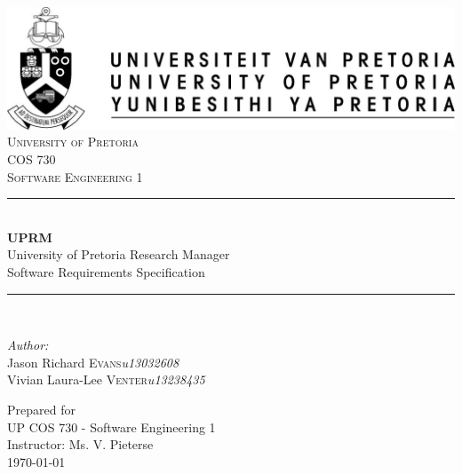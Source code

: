\documentclass[12pt, a4paper]{article}
\begin{document}
	\begin{titlepage}
		\newcommand{\HRule}{\rule{\linewidth}{0.5mm}}
		\center
		
		\includegraphics{up-logo.jpg} \\[1cm]
		
		\textsc{\LARGE University of Pretoria}\\[1.5cm]
		\textsc{\Large COS 730}\\[0.5cm]
		\textsc{\large Software Engineering 1}\\[0.5cm]

		\HRule \\[0.4cm]
		{ \huge \bfseries UPRM}\\[0.4cm]
		{\large University of Pretoria Research Manager}\\
		{Software Requirements Specification}\\

		\HRule \\[1.5cm]
		
		\begin{minipage}{1\textwidth}
			\begin{flushleft} \large
				\emph{Author:}\\
				Jason Richard \textsc{Evans}\hfill \emph{u13032608}\\
				Vivian Laura-Lee \textsc{Venter}\hfill \emph{u13238435} \\[1cm]
			\end{flushleft}
		\end{minipage}
		
		\vfill
		Prepared for \\
		UP COS 730 - Software Engineering 1 \\
		Instructor: Ms. V. Pieterse \\
		{\large \today}\\[6cm]
	\end{titlepage}

	\tableofcontents
	\pagebreak

	
	\pagebreak

	
	\pagebreak

	
	\pagebreak
\end{document}
